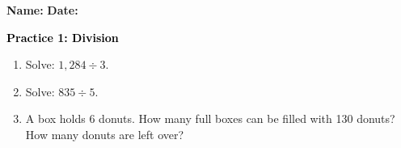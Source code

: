 \documentclass[12pt, letterpaper, fleqn]{article}
\begin{document}
\textbf{Name:} \underline{\hspace{5cm}}
\hfill
\textbf{Date:} \underline{\hspace{3cm}}\\

\begin{tcolorbox}[colback=customteal!20]
    \large\textcolor{black}{\textbf{Practice 1: Division}}
\end{tcolorbox}
\begin{enumerate}[itemsep=3.5cm, leftmargin=0.6cm]
\item Solve: $1,284 \div 3$.
\vspace{3.5cm}
\item Solve: $835 \div 5$.
\vspace{3.5cm}
\item A box holds 6 donuts. How many full boxes can be filled with 130 donuts? How many donuts are left over?
\end{enumerate}
\end{document}
